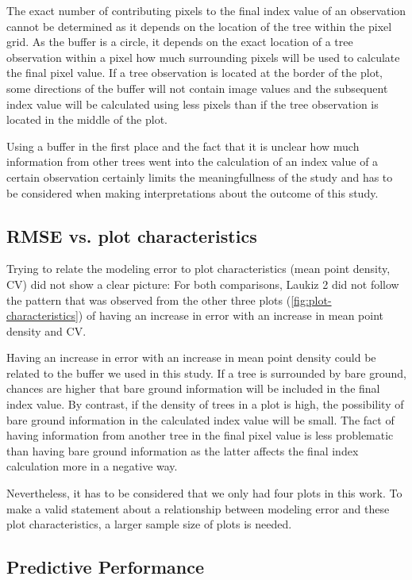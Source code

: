 \documentclass[review]{elsarticle}
\begin{document}
The exact number of contributing pixels to the final index value of an observation cannot be determined as it depends on the location of the tree within the pixel grid.
As the buffer is a circle, it depends on the exact location of a tree observation within a pixel how much surrounding pixels will be used to calculate the final pixel value.
If a tree observation is located at the border of the plot, some directions of the buffer will not contain image values and the subsequent index value will be calculated using less pixels than if the tree observation is located in the middle of the plot.

Using a buffer in the first place and the fact that it is unclear how much information from other trees went into the calculation of an index value of a certain observation certainly limits the meaningfullness of the study and has to be considered when making interpretations about the outcome of this study.

\subsection{RMSE vs. plot characteristics}

Trying to relate the modeling error to plot characteristics (mean point density, CV) did not show a clear picture: For both comparisons, Laukiz 2 did not follow the pattern that was observed from the other three plots (\autoref{fig:plot-characteristics}) of having an increase in error with an increase in mean point density and CV.

Having an increase in error with an increase in mean point density could be related to the buffer we used in this study. 
If a tree is surrounded by bare ground, chances are higher that bare ground information will be included in the final index value. 
By contrast, if the density of trees in a plot is high, the possibility of bare ground information in the calculated index value will be small.
The fact of having information from another tree in the final pixel value is less problematic than having bare ground information as the latter affects the final index calculation more in a negative way.  

Nevertheless, it has to be considered that we only had four plots in this work. 
To make a valid statement about a relationship between modeling error and these plot characteristics, a larger sample size of plots is needed.

\subsection{Predictive Performance}
\end{document}

